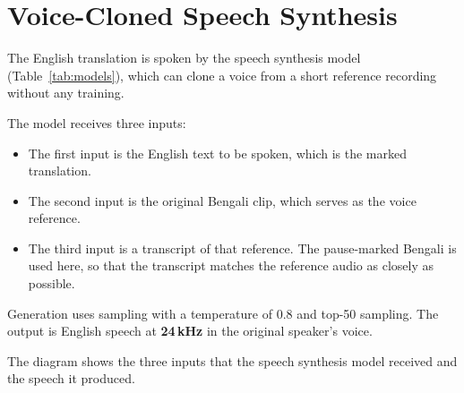 \section{Voice-Cloned Speech Synthesis}

The English translation is spoken by the speech synthesis model (Table~\ref{tab:models}), which can clone a voice from a short reference recording without any training.

The model receives three inputs:
\begin{itemize}[nosep]
  \item The first input is the English text to be spoken, which is the marked translation.
  \item The second input is the original Bengali clip, which serves as the voice reference.
  \item The third input is a transcript of that reference. The pause-marked Bengali is used here, so that the transcript matches the reference audio as closely as possible.
\end{itemize}
Generation uses sampling with a temperature of 0.8 and top-50 sampling. The output is English speech at \textbf{24\,kHz} in the original speaker's voice.

\begin{example}
The diagram shows the three inputs that the speech synthesis model received and the speech it produced.

\begin{center}

\end{center}
\end{example}
